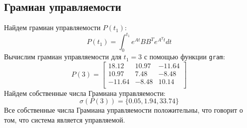 \subsection{Грамиан управляемости}
Найдем грамиан управляемости $P(t_1)$:
\begin{equation}
    P(t_1) = \int_{0}^{t_1} e^{At}BB^Te^{A^Tt}dt
\end{equation}
Вычислим грамиан управляемости для $t_1 = 3$ с помощью функции \texttt{gram}: 
\begin{equation}
    P(3) = \begin{bmatrix}
        18.12 & 10.97 & -11.64 \\ 
        10.97 & 7.48 & -8.48 \\ 
        -11.64 & -8.48 & 10.14 \\ 
    \end{bmatrix}
\end{equation}
Найдем собственные числа Грамиана управляемости: 
\begin{equation}
    \sigma(P(3)) = \{ 0.05, 1.94, 33.74 \}
\end{equation}
Все собственные числа Грамиана управляемости положительны, что говорит о том, что система является управляемой.


